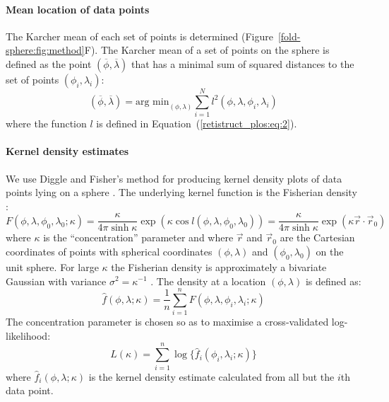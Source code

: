 \documentclass[10pt]{article}
\begin{document}
\paragraph{Mean location of data points}
\label{retistruct_plos:sec:mean-location-data}

The Karcher mean of each set of points is determined
(Figure~\ref{fold-sphere:fig:method}F). The Karcher mean of a set of
points on the sphere \cite{Karc77riem,HeoSmal06form} is defined as the
point $(\overline{\phi}, \overline{\lambda})$ that has a minimal sum
of squared distances to the set of points $(\phi_i, \lambda_i)$:
\begin{equation}
  \label{retistruct_plos:eq:3}
  (\overline{\phi}, \overline{\lambda}) = \mbox{arg min}_{(\phi,
    \lambda)} \sum_{i=1}^N l^2(\phi, \lambda, \phi_i, \lambda_i)
\end{equation}
where the function $l$ is defined in
Equation~(\ref{retistruct_plos:eq:2}).

\paragraph{Kernel density estimates}
\label{retistruct_plos:sec:kern-dens-estim}

We use Diggle and Fisher's method for producing kernel density plots
of data points lying on a sphere \cite{DiggFish85sphe}. The underlying kernel
function is the Fisherian density \cite{Fish53disp}:
\begin{equation}
  \label{kernel-density:eq:3}
  F(\phi, \lambda, \phi_0, \lambda_0; \kappa) = \frac{\kappa}{4\pi\sinh \kappa}
  \exp(\kappa\cos l(\phi, \lambda, \phi_0, \lambda_0)) 
= \frac{\kappa}{4\pi\sinh \kappa}\exp(\kappa\vec{r}\cdot\vec{r}_0)
\end{equation}
where $\kappa$ is the ``concentration'' parameter and where $\vec{r}$ and
$\vec{r}_0$ are the Cartesian coordinates of points with spherical
coordinates $(\phi, \lambda)$ and $(\phi_0, \lambda_0)$ on the unit
sphere. For large $\kappa$ the Fisherian density is approximately a
bivariate Gaussian with variance $\sigma^2=\kappa^{-1}$
\cite{DiggFish85sphe}. The density at a location $(\phi,\lambda)$ is
defined as:
\begin{equation}
  \hat f(\phi,\lambda;\kappa) = \frac{1}{n} \sum_{i=1}^n F(\phi, \lambda, \phi_i, \lambda_i; \kappa)
\end{equation}
The concentration parameter is chosen so as to maximise a
cross-validated log-likelihood:
\begin{equation}
  \label{kernel-density:eq:2}
  L(\kappa) = \sum_{i=1}^n \log\{\hat f_{i}(\phi_i, \lambda_i;\kappa)\}
\end{equation}
where $\hat f_{i}(\phi, \lambda;\kappa)$ is the kernel density estimate
calculated from all but the $i$th data point.
\end{document}
